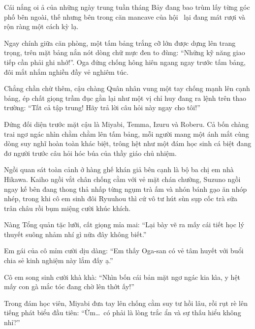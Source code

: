 \documentclass[../main.tex]{subfiles}
\begin{document}

Cái nắng oi ả của những ngày trung tuần tháng Bảy đang bao trùm lấy từng góc phố bên ngoài, thế nhưng bên trong căn mancave của hội \hls\ lại đang mát rượi và rộn ràng một cách kỳ lạ.

Ngay chính giữa căn phòng, một tấm bảng trắng cỡ lớn được dựng lên trang trọng, trên mặt bảng nắn nót dòng chữ mực đen to đùng: ``Những kỹ năng giao tiếp cần phải ghi nhớ!''. Oga đứng chống hông hiên ngang ngay trước tấm bảng, đôi mắt nhắm nghiền đầy vẻ nghiêm túc.


Chẳng chần chừ thêm, cậu chàng Quân nhân vung một tay chống mạnh lên cạnh bảng, ép chất giọng trầm đục gằn lại như một vị chỉ huy đang ra lệnh trên thao trường: ``Tất cả tập trung! Hãy trả lời câu hỏi này ngay cho tôi!''

Đứng đối diện trước mặt cậu là Miyabi, Temma, Izuru và Roberu. Cả bốn chàng trai ngơ ngác nhìn chằm chằm lên tấm bảng, mỗi người mang một ánh mắt cùng dòng suy nghĩ hoàn toàn khác biệt, trông hệt như một đám học sinh cá biệt đang đơ người trước câu hỏi hóc búa của thầy giáo chủ nhiệm.


Ngồi quan sát toàn cảnh ở hàng ghế khán giả bên cạnh là bộ ba chị em nhà Hikawa. Kaiho ngồi vắt chân chống cằm với vẻ mặt chán chường, Suzuno ngồi ngay kế bên đang thong thả nhấp từng ngụm trà ấm và nhón bánh gạo ăn nhóp nhép, trong khi cô em sinh đôi Ryuuhou thì cứ vô tư hút sùn sụp cốc trà sữa trân châu rồi bụm miệng cười khúc khích.

Nàng Tổng quản tặc lưỡi, cất giọng mỉa mai: ``Lại bày vẽ ra mấy cái tiết học lý thuyết suông nhảm nhí gì nữa đây không biết.''

Em gái của cô mỉm cười dịu dàng: ``Em thấy Oga-san có vẻ tâm huyết với buổi chia sẻ kinh nghiệm này lắm đấy ạ.''

Cô em song sinh cười khà khà: ``Nhìn bốn cái bản mặt ngơ ngác kia kìa, y hệt mấy con gà mắc tóc đang chờ lên thớt ấy!''

Trong đám học viên, Miyabi đưa tay lên chống cằm suy tư hồi lâu, rồi rụt rè lên tiếng phát biểu đầu tiên: ``Ừm\dots\ có phải là lòng trắc ẩn và sự thấu hiểu không nhỉ?''
\end{document}
